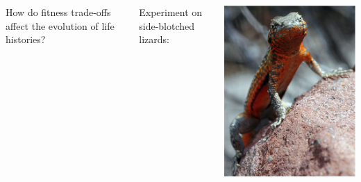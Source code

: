 \begin{frame}[t]
    \begin{adjustwidth}{-2em}{-1.5em}

        \vspace{-5mm}
        \begin{columns}[t]


            How do fitness trade-offs affect the evolution of life histories?
            
            \vspace{4mm}
            Experiment on side-blotched lizards:



            \begin{flushright}
            \includegraphics[width=0.85\columnwidth]{uta.png}
            \end{flushright}


\end{columns}
\end{adjustwidth}
\end{frame}
